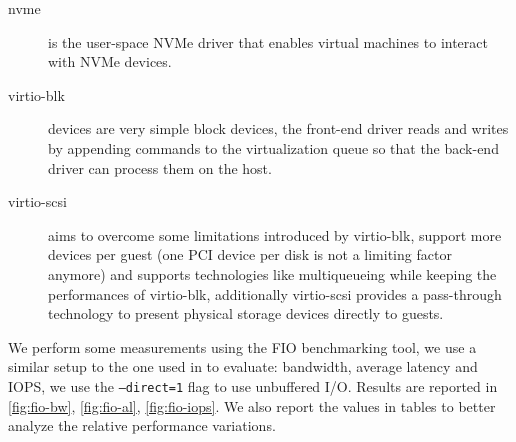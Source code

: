 \documentclass[twocolumn]{article}
\begin{document}
\begin{description}
    \item[nvme] is the user-space NVMe driver that enables virtual machines to interact with NVMe devices.
    \item[virtio-blk] devices are very simple block devices, the front-end driver reads and writes by appending commands to the virtualization queue so that the back-end driver can process them on the host.
    \item[virtio-scsi] aims to overcome some limitations introduced by virtio-blk, support more devices per guest (one PCI device per disk is not a limiting factor anymore) and supports technologies like multiqueueing while keeping the performances of virtio-blk, additionally virtio-scsi provides a pass-through technology to present physical storage devices directly to guests.\cite{scsi}
\end{description}

We perform some measurements using the FIO \cite{fio} benchmarking tool, we use a similar setup to the one used in \cite{spool} to evaluate: bandwidth, average latency and IOPS, we use the \texttt{--direct=1} flag to use unbuffered I/O. Results are reported in \ref{fig:fio-bw}, \ref{fig:fio-al}, \ref{fig:fio-iops}. We also report the values in tables to better analyze the relative performance variations.
\end{document}
